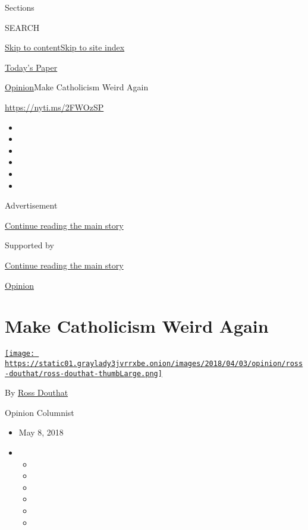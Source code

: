 Sections

SEARCH

\protect\hyperlink{site-content}{Skip to
content}\protect\hyperlink{site-index}{Skip to site index}

\href{https://myaccount.nytimes3xbfgragh.onion/auth/login?response_type=cookie\&client_id=vi}{}

\href{https://www.nytimes3xbfgragh.onion/section/todayspaper}{Today's
Paper}

\href{/section/opinion}{Opinion}\textbar{}Make Catholicism Weird Again

\url{https://nyti.ms/2FWOzSP}

\begin{itemize}
\item
\item
\item
\item
\item
\item
\end{itemize}

Advertisement

\protect\hyperlink{after-top}{Continue reading the main story}

Supported by

\protect\hyperlink{after-sponsor}{Continue reading the main story}

\href{/section/opinion}{Opinion}

\hypertarget{make-catholicism-weird-again}{%
\section{Make Catholicism Weird
Again}\label{make-catholicism-weird-again}}

\href{https://www.nytimes3xbfgragh.onion/by/ross-douthat}{\texttt{[image: https://static01.graylady3jvrrxbe.onion/images/2018/04/03/opinion/ross-douthat/ross-douthat-thumbLarge.png]}}

By \href{https://www.nytimes3xbfgragh.onion/by/ross-douthat}{Ross
Douthat}

Opinion Columnist

\begin{itemize}
\item
  May 8, 2018
\item
  \begin{itemize}
  \item
  \item
  \item
  \item
  \item
  \item
  \end{itemize}
\end{itemize}

